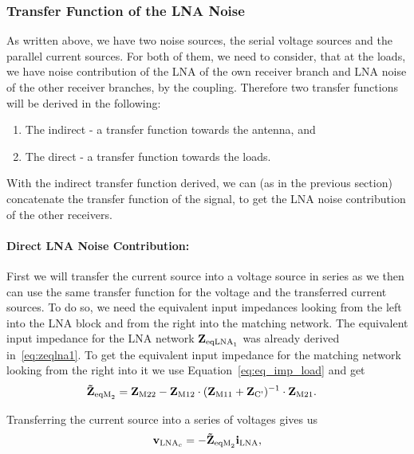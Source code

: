 \subsubsection{Transfer Function of the LNA Noise}
\label{sec:antenna_noise_transf}
As written above, we have two noise sources, the serial voltage sources and the parallel current sources.
For both of them, we need to consider, that at the loads, we have noise contribution of the LNA of the own receiver branch and LNA noise of the other receiver branches, by the coupling.
Therefore two transfer functions will be derived in the following:
\begin{enumerate}
\item The indirect - a transfer function towards the antenna, and
\item The direct - a transfer function towards the loads.
\end{enumerate}
With the indirect transfer function derived, we can (as in the previous section) concatenate the transfer function of the signal, to get the LNA noise contribution of the other receivers. 

\paragraph{Direct LNA Noise Contribution:}
First we will transfer the current source into a voltage source in series as we then can use the same transfer function for the voltage and the transferred current sources.
To do so, we need the equivalent input impedances looking from the left into the LNA block and from the right into the matching network.
The equivalent input impedance for the LNA network $\mathbf{Z}_{\text{eqLNA}_1}$ was already derived in~\eqref{eq:zeqlna1}.
To get the equivalent input impedance for the matching network looking from the right into it we use Equation~\eqref{eq:eq_imp_load} and get
\begin{align}
\label{eq:zr}
\mathbf{\tilde{Z}}_{\text{eqM}_2} &= \mathbf{Z}_\text{M22} - \mathbf{Z}_\text{M12}\cdot(\mathbf{Z}_\text{M11} + \mathbf{Z}_\text{C'})^{-1}\cdot\mathbf{Z}_\text{M21}.
\end{align}

Transferring the current source into a series of voltages gives us 
\begin{equation}
\mathbf{v}_{\text{LNA}_c} = -\mathbf{\tilde{Z}}_{\text{eqM}_2} \mathbf{i}_\text{LNA},
\end{equation}

